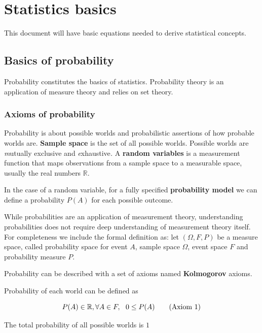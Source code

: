 \chapter{Statistics basics}

This document will have basic equations needed to derive statistical concepts.

\section{Basics of probability}

Probability constitutes the basics of statistics. Probability theory is an application of measure theory and relies on set theory.

\subsection{Axioms of probability}

Probability is about possible worlds and probabilistic assertions of how probable worlds are. \textbf{Sample space} is the set of all possible worlds. Possible worlds are \textit{m}utually exclusive\textit{ }and \textit{e}xhaustive\textit{.} A \textbf{random variables} is a measurement function that maps observations from a sample space to a measurable space, usually the real numbers \(\mathbb{R}\).

In the case of a random variable, for a fully specified \textbf{probability model} we can define a probability \(P(A)\) for each possible outcome.

While probabilities are an application of measurement theory, understanding probabilities does not require deep understanding of measurement theory itself. For completeness we include the formal definition as: let \((\Omega, F, P)\) be a measure space, called probability space for event \(A\), sample space \(\Omega\), event space \(F\) and probability measure \(P\).

Probability can be described with a set of axioms named \textbf{Kolmogorov} axioms.

Probability of each world can be defined as

\begin{equation}P(A) \in \mathbb{R}, \\
\forall A \in F,\ \ 0 \le P(A) \tag{Axiom 1}\end{equation}

The total probability of all possible worlds is \(1\)

